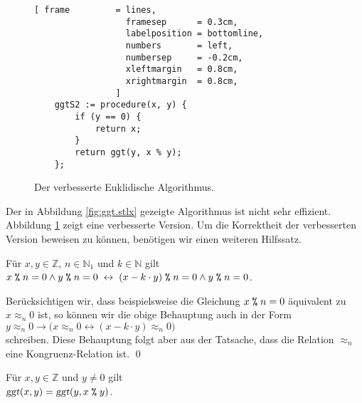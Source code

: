 \begin{figure}[!ht]
\centering
\begin{Verbatim}[ frame         = lines, 
                  framesep      = 0.3cm, 
                  labelposition = bottomline,
                  numbers       = left,
                  numbersep     = -0.2cm,
                  xleftmargin   = 0.8cm,
                  xrightmargin  = 0.8cm,
                ]
    ggtS2 := procedure(x, y) {
        if (y == 0) {
            return x;
        }
        return ggt(y, x % y); 
    };
\end{Verbatim}
\vspace*{-0.3cm}
\caption{Der verbesserte Euklidische Algorithmus.}
\label{fig:ggt2.stlx}
\end{figure}

Der in Abbildung \ref{fig:ggt.stlx} gezeigte Algorithmus ist nicht sehr effizient. 
Abbildung \ref{fig:ggt2.stlx} zeigt eine verbesserte Version.  Um die Korrektheit der verbesserten
Version beweisen zu können, benötigen wir einen weiteren Hilfssatz.

\begin{Lemma} Für $x,y \in \mathbb{Z}$, $n \in \mathbb{N}_1$ und $k \in \mathbb{N}$ gilt
\\[0.2cm]
\hspace*{1.3cm}
  $x \;\texttt{\%}\; n = 0 \wedge y \;\texttt{\%}\; n = 0 \;\leftrightarrow\; 
   (x - k \cdot y) \;\texttt{\%}\; n = 0 \wedge y \;\texttt{\%}\; n = 0
  $.
\end{Lemma}

\proof
Berücksichtigen wir, dass beispielsweise die Gleichung $x \;\texttt{\%}\; n = 0$ äquivalent zu 
$x \approx_n 0$ ist, so können wir die obige Behauptung auch in der Form
\\[0.2cm]
\hspace*{1.3cm}
$y \approx_n 0 \rightarrow \bigl(x \approx_n 0 \leftrightarrow (x - k \cdot y) \approx_n 0\bigr)$
\\[0.2cm]
schreiben.  Diese Behauptung folgt aber aus der
Tatsache, dass die Relation $\approx_n$ eine Kongruenz-Relation ist. \qed


\begin{Korollar} \label{korollar:ggt2}
Für $x,y \in \mathbb{Z}$ und $y \not= 0$ gilt
\\[0.2cm]
\hspace*{1.3cm}
$\textsl{ggt}(x,y) = \textsl{ggt}(y, x \;\texttt{\%}\; y)$.
\end{Korollar}

